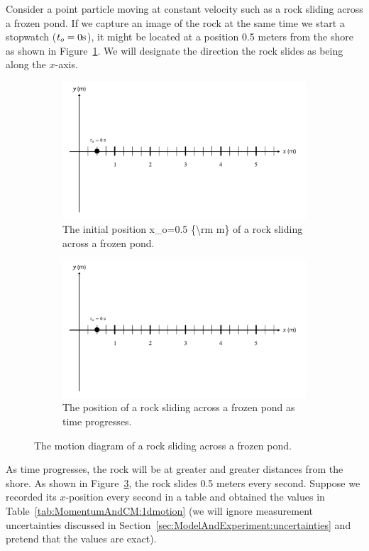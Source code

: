 \documentclass[9pt,arxiv,red]{lapreprint}
\begin{document}
Consider a point particle moving at constant velocity such as a rock sliding across a frozen pond. If we capture an image of the rock at the same time we start a stopwatch ($t_o = 0 {\rm s}$), it might be located at a position 0.5 meters from the shore as shown in Figure~\ref{fig:momentumandcm:constvelmotiona}. We will designate the direction the rock slides as being along the $x$-axis.

\begin{figure}[!htbp]
\centering
\begin{figure}[!htbp]
\centering
\includegraphics[width=0.7\linewidth]{files/ConstVelDotsa-bb1e54c58a33c4382d81aa1e636f3fb7.png}
\caption[]{The initial position x\_o=0.5 \{{\textbackslash}rm m\} of a rock sliding across a frozen pond.}
\label{fig:momentumandcm:constvelmotiona}
\end{figure}

\begin{figure}[!htbp]
\centering
\includegraphics[width=0.7\linewidth]{files/ConstVelDotsa-bb1e54c58a33c4382d81aa1e636f3fb7.png}
\caption[]{The position of a rock sliding across a frozen pond as time progresses.}
\label{fig:momentumandcm:constvelmotionb}
\end{figure}
\caption[]{The motion diagram of a rock sliding across a frozen pond.}
\label{fig:momentumandcm:constvelmotionb}
\end{figure}

As time progresses, the rock will be at greater and greater distances from the shore. As shown in Figure~\ref{fig:momentumandcm:constvelmotionb}, the rock slides 0.5 meters every second. Suppose we recorded its $x$-position every second in a table and obtained the values in Table~\ref{tab:MomentumAndCM:1dmotion} (we will ignore measurement uncertainties discussed in Section~\ref{sec:ModelAndExperiment:uncertainties} and pretend that the values are exact).
\end{document}
